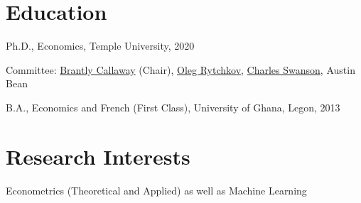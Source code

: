 \documentclass[12pt,letterpaper]{article}
\renewenvironment{itemize}{
  \begin{list}{}{
    \setlength{\leftmargin}{1.5em}
  }
}{
  \end{list}
}
\begin{document}
\section*{Education}

\begin{itemize}
  \item Ph.D., Economics, Temple University, 2020
  \begin{itemize}
  \item Committee: \href{https://bcallaway11.github.io/index.html}{Brantly Callaway} (Chair), \href{https://astro.temple.edu/~rytchkov/}{Oleg Rytchkov}, \href{https://liberalarts.temple.edu/academics/faculty/swanson-charles}{Charles Swanson}, Austin Bean
  \end{itemize}

  \item B.A., Economics and French (First Class), University of Ghana, Legon, 2013
\end{itemize}

\section*{Research Interests}
\begin{itemize}
  \item Econometrics (Theoretical and Applied) as well as Machine Learning
\end{itemize}
\end{document}
